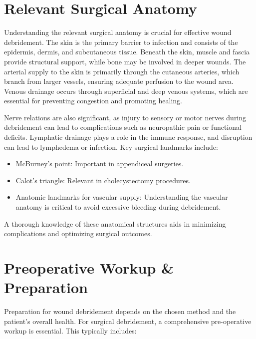 \section*{Relevant Surgical Anatomy}
Understanding the relevant surgical anatomy is crucial for effective wound debridement. The skin is the primary barrier to infection and consists of the epidermis, dermis, and subcutaneous tissue. Beneath the skin, muscle and fascia provide structural support, while bone may be involved in deeper wounds. The arterial supply to the skin is primarily through the cutaneous arteries, which branch from larger vessels, ensuring adequate perfusion to the wound area. Venous drainage occurs through superficial and deep venous systems, which are essential for preventing congestion and promoting healing.

Nerve relations are also significant, as injury to sensory or motor nerves during debridement can lead to complications such as neuropathic pain or functional deficits. Lymphatic drainage plays a role in the immune response, and disruption can lead to lymphedema or infection. Key surgical landmarks include:

\begin{itemize}
  \item McBurney's point: Important in appendiceal surgeries.
  \item Calot's triangle: Relevant in cholecystectomy procedures.
  \item Anatomic landmarks for vascular supply: Understanding the vascular anatomy is critical to avoid excessive bleeding during debridement.
\end{itemize}

A thorough knowledge of these anatomical structures aids in minimizing complications and optimizing surgical outcomes.

\section*{Preoperative Workup \& Preparation}
Preparation for wound debridement depends on the chosen method and the patient's overall health. For surgical debridement, a comprehensive pre-operative workup is essential. This typically includes:

